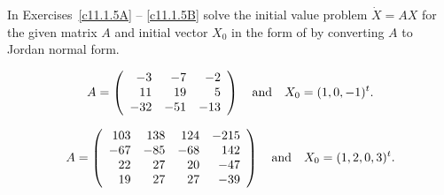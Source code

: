 \noindent In Exercises~\ref{c11.1.5A} -- \ref{c11.1.5B} solve the initial 
value problem $\dot{X}=AX$ for the given matrix $A$ and initial vector
$X_0$ in the form of  by converting $A$ to Jordan normal
form.
\begin{exercise} \label{c11.1.5A}
\begin{equation*}
A=\left(\begin{array}{rrr}  
    -3  &  -7 &   -2\\
    11  &  19  &   5\\
   -32  & -51 &  -13 \end{array} \right) \quad\mbox{and}\quad X_0=(1,0,-1)^t.
\end{equation*}
\end{exercise}
\begin{exercise} \label{c11.1.5B}
\begin{equation*}
A=\left(\begin{array}{rrrr}  
  103 &  138 &  124 &  -215 \\
  -67 &  -85 &  -68 &   142 \\
   22 &   27 &   20 &   -47 \\
   19 &   27 &   27 &   -39 \end{array} \right) \quad\mbox{and}\quad X_0=(1,2,0,3)^t.
\end{equation*}
\end{exercise}

